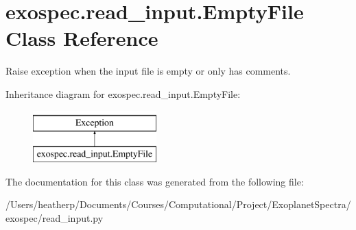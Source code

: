 \hypertarget{classexospec_1_1read__input_1_1_empty_file}{}\section{exospec.\+read\+\_\+input.\+Empty\+File Class Reference}
\label{classexospec_1_1read__input_1_1_empty_file}


Raise exception when the input file is empty or only has comments.  


Inheritance diagram for exospec.\+read\+\_\+input.\+Empty\+File\+:\begin{figure}[H]
\begin{center}
\leavevmode
\includegraphics[height=2.000000cm]{classexospec_1_1read__input_1_1_empty_file}
\end{center}
\end{figure}


The documentation for this class was generated from the following file\+:\begin{DoxyCompactItemize}
\item 
/\+Users/heatherp/\+Documents/\+Courses/\+Computational/\+Project/\+Exoplanet\+Spectra/exospec/read\+\_\+input.\+py\end{DoxyCompactItemize}
